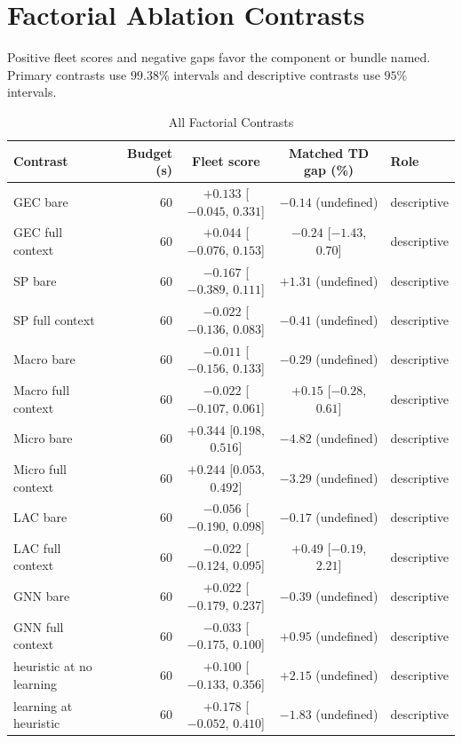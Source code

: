\documentclass{article}
\begin{document}
\section{Factorial Ablation Contrasts}
\label{sec:supp_ablation}

Positive fleet scores and negative gaps favor the component or bundle named. Primary contrasts use $99.38\%$ intervals and descriptive contrasts use $95\%$ intervals.

{\footnotesize
\begin{longtable}{l r c c l}
\caption{All Factorial Contrasts} \\
\toprule
Contrast & Budget (s) & Fleet score & Matched TD gap (\%) & Role \\
\midrule
\endhead
GEC bare & 60 & $+0.133$ [$-0.045$, $0.331$] & $-0.14$ (undefined) & descriptive \\
GEC full context & 60 & $+0.044$ [$-0.076$, $0.153$] & $-0.24$ [$-1.43$, $0.70$] & descriptive \\
SP bare & 60 & $-0.167$ [$-0.389$, $0.111$] & $+1.31$ (undefined) & descriptive \\
SP full context & 60 & $-0.022$ [$-0.136$, $0.083$] & $-0.41$ (undefined) & descriptive \\
Macro bare & 60 & $-0.011$ [$-0.156$, $0.133$] & $-0.29$ (undefined) & descriptive \\
Macro full context & 60 & $-0.022$ [$-0.107$, $0.061$] & $+0.15$ [$-0.28$, $0.61$] & descriptive \\
Micro bare & 60 & $+0.344$ [$0.198$, $0.516$] & $-4.82$ (undefined) & descriptive \\
Micro full context & 60 & $+0.244$ [$0.053$, $0.492$] & $-3.29$ (undefined) & descriptive \\
LAC bare & 60 & $-0.056$ [$-0.190$, $0.098$] & $-0.17$ (undefined) & descriptive \\
LAC full context & 60 & $-0.022$ [$-0.124$, $0.095$] & $+0.49$ [$-0.19$, $2.21$] & descriptive \\
GNN bare & 60 & $+0.022$ [$-0.179$, $0.237$] & $-0.39$ (undefined) & descriptive \\
GNN full context & 60 & $-0.033$ [$-0.175$, $0.100$] & $+0.95$ (undefined) & descriptive \\
heuristic at no learning & 60 & $+0.100$ [$-0.133$, $0.356$] & $+2.15$ (undefined) & descriptive \\
learning at heuristic & 60 & $+0.178$ [$-0.052$, $0.410$] & $-1.83$ (undefined) & descriptive \\

\end{longtable}}
\end{document}
